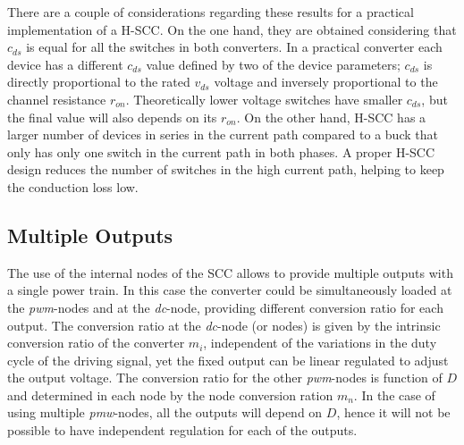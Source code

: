 There are a couple of considerations regarding these results for a practical implementation of a H-SCC. On the one hand, they are obtained considering that $c_{ds}$ is equal for all the switches in both converters. In a practical converter each device has a different $c_{ds}$ value defined by two of the device parameters; $c_{ds}$ is directly proportional to the rated $v_{ds}$  voltage and inversely proportional to the channel resistance $r_{on}$. Theoretically lower voltage switches have smaller $c_{ds}$, but the final value will also depends on its $r_{on}$. On the other hand, H-SCC has a larger number of devices in series in the current path compared to a buck that only has only one switch in the current path in both phases. A proper H-SCC design reduces the number of switches in the high current path, helping to keep the conduction loss low. %



\subsection{Multiple Outputs}

The use of the internal nodes of the SCC allows to provide multiple outputs with a single power train. In this case the converter could be simultaneously loaded at the \emph{pwm}-nodes and at the \emph{dc}-node, providing different conversion ratio for each output. The conversion ratio at the \emph{dc}-node (or nodes)  is given by the intrinsic conversion ratio of the converter $m_i$, independent of the variations in the duty cycle of the driving signal, yet the fixed output can be linear regulated to adjust the output voltage.  The conversion ratio for the other \emph{pwm}-nodes is function of $D$ and determined in each node by the node conversion ration $m_n$. In the case of using multiple \emph{pmw}-nodes, all the outputs will depend on $D$, hence it will not be possible to have independent regulation for each of the outputs.

